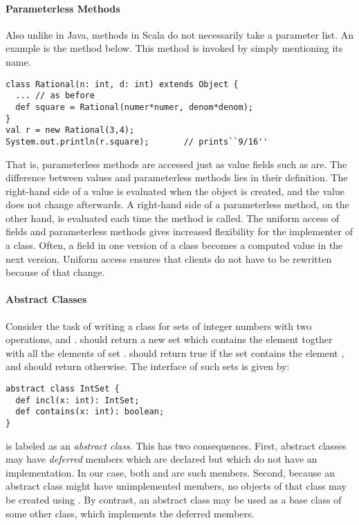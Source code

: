 \documentclass[a4paper,12pt,twoside,titlepage]{book}
\begin{document}
\paragraph{Parameterless Methods}
Also unlike in Java, methods in Scala do not necessarily take a
parameter list. An example is the  method below. This
method is invoked by simply mentioning its name. 
\begin{lstlisting}
class Rational(n: int, d: int) extends Object {
  ... // as before
  def square = Rational(numer*numer, denom*denom);
}
val r = new Rational(3,4);
System.out.println(r.square);		// prints``9/16''
\end{lstlisting}
That is, parameterless methods are accessed just as value fields such
as  are. The difference between values and parameterless
methods lies in their definition. The right-hand side of a value is
evaluated when the object is created, and the value does not change
afterwards. A right-hand side of a parameterless method, on the other
hand, is evaluated each time the method is called.  The uniform access
of fields and parameterless methods gives increased flexibility for
the implementer of a class. Often, a field in one version of a class
becomes a computed value in the next version. Uniform access ensures
that clients do not have to be rewritten because of that change.

\paragraph{Abstract Classes}

Consider the task of writing a class for sets of integer numbers with
two operations,  and . 
should return a new set which contains the element  togther
with all the elements of set .  should
return true if the set  contains the element , and
should return  otherwise. The interface of such sets is
given by:  
\begin{lstlisting}
abstract class IntSet {
  def incl(x: int): IntSet;
  def contains(x: int): boolean;
}
\end{lstlisting}
 is labeled as an \emph{abstract class}. This has two
consequences.  First, abstract classes may have {\em deferred} members
which are declared but which do not have an implementation. In our
case, both  and  are such members. Second,
because an abstract class might have unimplemented members, no objects
of that class may be created using . By contrast, an
abstract class may be used as a base class of some other class, which
implements the deferred members.
\end{document}
